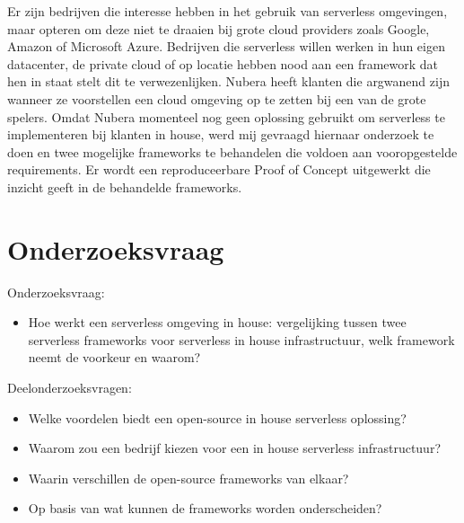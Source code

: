 Er zijn bedrijven die interesse hebben in het gebruik van serverless omgevingen, maar opteren om deze niet te draaien bij grote cloud providers zoals Google, Amazon of Microsoft Azure. Bedrijven die serverless willen werken in hun eigen datacenter, de private cloud of op locatie hebben nood aan een framework dat hen in staat stelt dit te verwezenlijken. Nubera heeft klanten die argwanend zijn wanneer ze voorstellen een cloud omgeving op te zetten bij een van de grote spelers. Omdat Nubera momenteel nog geen oplossing gebruikt om serverless te implementeren bij klanten in house, werd mij gevraagd hiernaar onderzoek te doen en twee mogelijke frameworks te behandelen die voldoen aan vooropgestelde requirements. Er wordt een reproduceerbare Proof of Concept uitgewerkt die inzicht geeft in de behandelde frameworks.

\section{Onderzoeksvraag}
\label{sec:onderzoeksvraag}


Onderzoeksvraag: 
\begin{itemize}
    \item Hoe werkt een serverless omgeving in house: vergelijking tussen twee serverless frameworks  voor serverless in house infrastructuur, welk framework neemt de voorkeur en waarom?
\end{itemize}

Deelonderzoeksvragen: 
\begin{itemize}
    \item Welke voordelen biedt een open-source in house serverless oplossing?
    \item Waarom zou een bedrijf kiezen voor een in house serverless infrastructuur?
    \item Waarin verschillen de open-source frameworks van elkaar?
    \item Op basis van wat kunnen de frameworks worden onderscheiden? 
\end{itemize}

